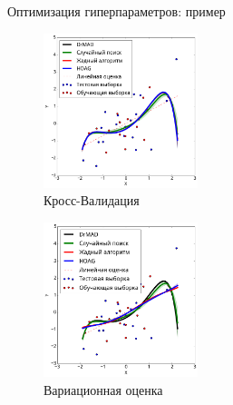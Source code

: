 \documentclass[usenames,dvipsnames,11pt,pdf,utf8,russian,aspectratio=169]{beamer}
\begin{document}

\begin{frame}{Оптимизация гиперпараметров: пример}
\begin{multicols}{2}
\begin{figure}[h]
\includegraphics[width=0.4\textwidth]{./slide_plots/poly_cv.png}
\caption*{Кросс-Валидация}
\end{figure}

\begin{figure}[h]
\includegraphics[width=0.4\textwidth]{./slide_plots/poly_var.png}
\caption*{Вариационная оценка}
\end{figure}
\end{multicols}

\end{frame}
\end{document}

